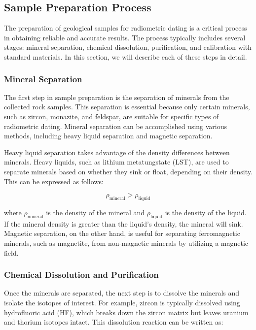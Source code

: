 \documentclass{article}
\begin{document}
\subsection{Sample Preparation Process}

The preparation of geological samples for radiometric dating is a critical process in obtaining reliable and accurate results. The process typically includes several stages: mineral separation, chemical dissolution, purification, and calibration with standard materials. In this section, we will describe each of these steps in detail.

\subsubsection*{Mineral Separation}

The first step in sample preparation is the separation of minerals from the collected rock samples. This separation is essential because only certain minerals, such as zircon, monazite, and feldspar, are suitable for specific types of radiometric dating. Mineral separation can be accomplished using various methods, including heavy liquid separation and magnetic separation.

Heavy liquid separation takes advantage of the density differences between minerals. Heavy liquids, such as lithium metatungstate (LST), are used to separate minerals based on whether they sink or float, depending on their density. This can be expressed as follows:

\[
\rho_{\text{mineral}} > \rho_{\text{liquid}}
\]

where \( \rho_{\text{mineral}} \) is the density of the mineral and \( \rho_{\text{liquid}} \) is the density of the liquid. If the mineral density is greater than the liquid's density, the mineral will sink. Magnetic separation, on the other hand, is useful for separating ferromagnetic minerals, such as magnetite, from non-magnetic minerals by utilizing a magnetic field.

\subsubsection*{Chemical Dissolution and Purification}

Once the minerals are separated, the next step is to dissolve the minerals and isolate the isotopes of interest. For example, zircon is typically dissolved using hydrofluoric acid (HF), which breaks down the zircon matrix but leaves uranium and thorium isotopes intact. This dissolution reaction can be written as:
\end{document}
